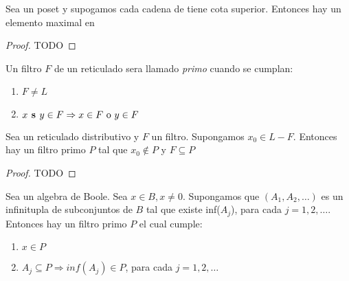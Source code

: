 \begin{lemma}[Zorn]
  Sea \poset un poset y supogamos cada cadena de \poset tiene cota superior. Entonces
  hay un elemento maximal en \poset
\end{lemma}
\begin{proof}
  TODO
\end{proof}

\begin{definition}
  Un filtro $F$ de un reticulado \reticulAlg sera llamado \emph{primo} cuando se cumplan:
  \begin{enumerate}
    \item $F \neq L$
    \item $x\textbf{ s }y \in F \Rightarrow x \in F \text{ o } y \in F$
  \end{enumerate}
\end{definition}

\begin{theorem}
  Sea \reticulAlg un reticulado distributivo y $F$ un filtro. Supongamos $x_0 \in L - F$. Entonces hay un filtro primo
  $P$ tal que $x_0 \notin P$ y $F \subseteq P$
\end{theorem}
\begin{proof}
  TODO
\end{proof}

\begin{theorem}
  Sea \algBoole un algebra de Boole. Sea $x \in B, x \neq 0$. Supongamos que $(A_1, A_2, \dots)$ es un infinitupla 
  de subconjuntos de $B$ tal que existe inf($A_j$), para cada $j = 1, 2, \dots$. Entonces hay un filtro primo $P$ 
  el cual cumple:
  \begin{enumerate}
    \item $x \in P$
    \item $A_j \subseteq P \Rightarrow inf(A_j) \in P$, para cada $j = 1, 2, \dots$
  \end{enumerate}
\end{theorem}
\noproof
